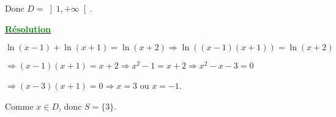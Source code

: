 \documentclass[12pt]{article}
\begin{document}
Donc $D=\left]1, +\infty\right[$.

\textbf{\underline{\textcolor{green}{Résolution}}}

$\ln(x-1) + \ln(x+1) = \ln(x+2) \Longrightarrow \ln((x-1)(x+1)) = \ln(x+2)$

$\Longrightarrow (x-1)(x+1) = x+2 \Longrightarrow x^2 - 1 = x+2 \Longrightarrow x^2 - x - 3 = 0$

$\Longrightarrow (x-3)(x+1) = 0 \Longrightarrow x=3$ ou $x=-1$.

Comme $x \in D$, donc $S=\{3\}$.
\end{document}
